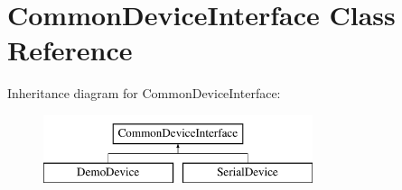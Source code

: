 \hypertarget{class_common_device_interface}{}\section{Common\+Device\+Interface Class Reference}
\label{class_common_device_interface}
Inheritance diagram for Common\+Device\+Interface\+:\begin{figure}[H]
\begin{center}
\leavevmode
\includegraphics[height=2.000000cm]{class_common_device_interface}
\end{center}
\end{figure}
